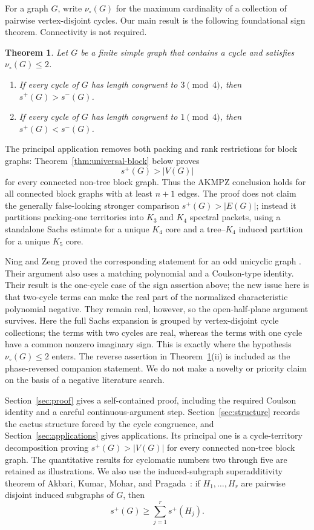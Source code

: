 \documentclass[11pt]{article}
\newtheorem{theorem}{Theorem}[section]
\theoremstyle{definition}
\theoremstyle{remark}
\newcommand{\vp}{\nu_{\circ}}
\begin{document}
For a graph $G$, write $\vp(G)$ for the maximum cardinality of a
collection of pairwise vertex-disjoint cycles.  Our main result is the
following foundational sign theorem.  Connectivity is not required.

\begin{theorem}\label{thm:main}
Let $G$ be a finite simple graph that contains a cycle and satisfies
$\vp(G)\le2$.
\begin{enumerate}[label=\textup{(\roman*)}]
\item If every cycle of $G$ has length congruent to $3\pmod4$, then
      $s^+(G)>s^-(G)$.
\item If every cycle of $G$ has length congruent to $1\pmod4$, then
      $s^+(G)<s^-(G)$.
\end{enumerate}
\end{theorem}

The principal application removes both packing and rank restrictions for
block graphs: Theorem~\ref{thm:universal-block} below proves
\[
 s^+(G)>|V(G)|
\]
for every connected non-tree block graph.  Thus the AKMPZ conclusion holds
for all connected block graphs with at least $n+1$ edges.  The proof does
not claim the generally false-looking stronger comparison $s^+(G)>|E(G)|$;
instead it partitions packing-one territories into $K_3$ and $K_4$ spectral
packets, using a standalone Sachs estimate for a unique $K_4$ core and a
tree--$K_4$ induced partition for a unique $K_5$ core.

Ning and Zeng proved the corresponding statement for an
odd unicyclic graph \cite{NingZeng}.  Their argument also uses a matching
polynomial and a Coulson-type identity.  Their result is the one-cycle case
of the sign assertion above; the new issue here is that two-cycle terms can
make the real part of the normalized characteristic polynomial negative.
They remain real, however, so the open-half-plane argument survives.  Here
the full Sachs expansion is
grouped by vertex-disjoint cycle collections; the terms with two cycles
are real, whereas the terms with one cycle have a common nonzero
imaginary sign.  This is exactly where the hypothesis $\vp(G)\le2$
enters.  The reverse assertion in Theorem~\ref{thm:main}(ii) is included
as the phase-reversed companion statement.  We do not make a novelty or
priority claim on the basis of a negative literature search.

Section~\ref{sec:proof} gives a self-contained proof, including the
required Coulson identity and a careful continuous-argument step.
Section~\ref{sec:structure} records the cactus structure forced by the
cycle congruence, and Section~\ref{sec:applications} gives applications.  Its
principal one is a cycle-territory decomposition proving $s^+(G)>|V(G)|$ for
every connected non-tree block graph.  The quantitative results for
cyclomatic numbers two through five are retained as illustrations.
We also use the induced-subgraph superadditivity theorem of Akbari, Kumar,
Mohar, and Pragada~\cite{AKMP}: if $H_1,\ldots,H_r$ are pairwise disjoint
induced subgraphs of $G$, then
\begin{equation}\label{eq:superadditivity}
 s^+(G)\ge\sum_{j=1}^r s^+(H_j).
\end{equation}
\end{document}
